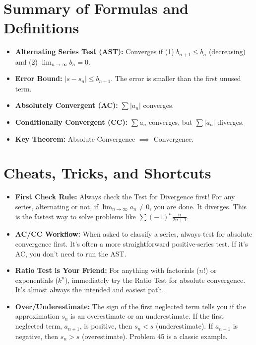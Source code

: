 \documentclass{article}
\begin{document}
\section{Summary of Formulas and Definitions}
\begin{itemize}
    \item \textbf{Alternating Series Test (AST):} Converges if (1) $b_{n+1} \le b_n$ (decreasing) and (2) $\lim_{n \to \infty} b_n = 0$.
    \item \textbf{Error Bound:} $|s - s_n| \le b_{n+1}$. The error is smaller than the first unused term.
    \item \textbf{Absolutely Convergent (AC):} $\sum |a_n|$ converges.
    \item \textbf{Conditionally Convergent (CC):} $\sum a_n$ converges, but $\sum |a_n|$ diverges.
    \item \textbf{Key Theorem:} Absolute Convergence $\implies$ Convergence.
\end{itemize}

\section{Cheats, Tricks, and Shortcuts}
\begin{itemize}
    \item \textbf{First Check Rule:} Always check the Test for Divergence first! For any series, alternating or not, if $\lim_{n \to \infty} a_n \neq 0$, you are done. It diverges. This is the fastest way to solve problems like $\sum (-1)^n \frac{n}{2n+1}$.
    \item \textbf{AC/CC Workflow:} When asked to classify a series, always test for absolute convergence first. It's often a more straightforward positive-series test. If it's AC, you don't need to run the AST.
    \item \textbf{Ratio Test is Your Friend:} For anything with factorials ($n!$) or exponentials ($k^n$), immediately try the Ratio Test for absolute convergence. It's almost always the intended and easiest path.
    \item \textbf{Over/Underestimate:} The sign of the first neglected term tells you if the approximation $s_n$ is an overestimate or an underestimate. If the first neglected term, $a_{n+1}$, is positive, then $s_n < s$ (underestimate). If $a_{n+1}$ is negative, then $s_n > s$ (overestimate). Problem 45 is a classic example.
\end{itemize}
\end{document}
